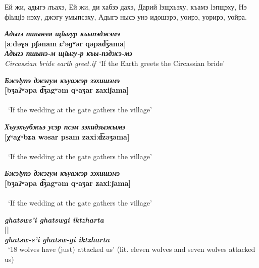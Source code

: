 \documentclass[a4paper,12pt]{book}
\newcommand{\1}[1]{\textbf{\emph{#1}}} %
\newcommand{\2}[1]{\textbf{[#1]}} %
\newcommand{\3}[1]{\fontsize{11pt}{0cm}\textbf{\emph{#1}}} %
\newcommand{\4}[1]{\fontsize{10pt}{0cm}\emph{#1}}	%
\newcommand{\5}[1]{\textbf{/#1/}} %
\newcommand{\6}[1]{\textbf{[#1]}} %
\newcommand{\7}[1]{\fontsize{12pt}{0cm}\emph{#1}} %
\newcommand{\8}[1]{\fontsize{12pt}{0cm}`#1'} %
\newcommand{\9}[1]{\fontsize{12pt}{0cm}(lit. `#1')} %
\begin{document}
Ей жи, адыгэ лъахэ,
Ей жи, ди хабзэ дахэ,
Дарий lэщхьэху, къамэ lэпщэху,
Нэ фlыцlэ нэху, джэгу умыпсэху,
Адыгэ нысэ унэ идошэрэ, уоирэ, уорирэ, уойра.



\begin{exe}
\ex
\1{Адыгэ пшынэм щlыгур къыпэджэмэ}\\
\2{aːdəɣa pʃənam ɕʼəɡʷər qəpad͡ʒama}\\
\3{Адыгэ пшынэ-м щlыгу-р къы-пэджэ-мэ}\\
\4{Circassian bride earth greet.if}\
\trans \8{If the Earth greets the Circassian bride}

\ex
\1{Бжэlупэ джэгум къуажэр зэхишэмэ}\\
\2{bʒaʔʷəpa d͡ʒagʷəm qʷaʒar zaxiʃama}\\
\3{}\\
\4{}\
\trans \8{If the wedding at the gate gathers the village}


\ex
\1{Хъуэхъубжьэ усэр псэм зэхидзыжымэ}\\
\2{χʷaχʷbʑa wəsar psam zaxiːd͡zəʒəma}\\
\3{}\\
\4{}\
\trans \8{If the wedding at the gate gathers the village}


\ex
\1{Бжэlупэ джэгум къуажэр зэхишэмэ}\\
\2{bʒaʔʷəpa d͡ʒagʷəm qʷaʒar zaxiːʃama}\\
\3{}\\
\4{}\
\trans \8{If the wedding at the gate gathers the village}
\end{exe}


\begin{exe}
\ex
\1{ghatsws'i ghatswgi iktzharta}\\
\2{}\\
\3{ghatsw-s'i ghatsw-gi iktzharta}\\
\4{}\
\trans \8{18 wolves have (just) attacked us} (lit. eleven wolves and seven wolves attacked us)
\end{exe}
\end{document}
